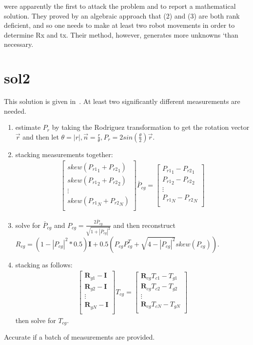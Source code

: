 \documentclass[a4paper]{report}
\begin{document}
\cite{shiu1989calibration} were apparently the
first to attack the problem and to report a mathematical
solution. They proved by an algebraic approach that (2)
and (3) are both rank deficient, and so one needs to
make at least two robot movements in order to
determine Rx and tx. Their method, however,
generates more unknowns ‘than necessary. 

\section{sol2}
This solution is given in~\cite{tsai1989new}. At least two significantly different measurements are needed.
\begin{enumerate}
\item estimate $P_r$ by taking the Rodriguez transformation to get the rotation vector $\vec{r}$ and then let $\theta=|r|, \vec{n}=\frac{r}{\theta}, P_r=2sin(\frac{\theta}{2})\vec{r}$.
\item stacking measurements together:
	\begin{align*}
		\left[
		\begin{matrix}
			skew({P_{r1}}_1+{P_{r2}}_1) \\
			skew({P_{r1}}_2+{P_{r2}}_2) \\
			\vdots \\
			skew({P_{r1}}_N+{P_{r2}}_N) \\
		\end{matrix}
		\right]\bar{P}_{cg} = \left[
		\begin{matrix}
		{P_{r1}}_1-{P_{r2}}_1 \\
		{P_{r1}}_2-{P_{r2}}_2 \\
		\vdots \\
		{P_{r1}}_N-{P_{r2}}_N \\
		\end{matrix}
		\right]
	\end{align*}
\item solve for $\bar{P}_{cg}$ and $P_{cg}=\frac{2\bar{P}_{cg}}{\sqrt{1+|\bar{P}_{cg}|^2}}$ and then reconstruct $R_{cg}=(1-|P_{cg}|^2*0.5)\mathbf{I}+0.5(P_{cg}P_{cg}^T+\sqrt{4-|P_{cg}|^2}skew(P_{cg}))$.
\item stacking as follows:
	\begin{align*}
		\left[
		\begin{matrix}
			\mathbf{R}_{g1}-\mathbf{I} \\
			\mathbf{R}_{g2}-\mathbf{I} \\
			\vdots \\
			\mathbf{R}_{gN}-\mathbf{I} \\
		\end{matrix}
		\right]{T}_{cg} = \left[
		\begin{matrix}
		\mathbf{R}_{cg}T_{c1}-T_{g1} \\ 
		\mathbf{R}_{cg}T_{c2}-T_{g2} \\ 
		\vdots \\
		\mathbf{R}_{cg}T_{cN}-T_{gN} \\ 
		\end{matrix}
		\right]
	\end{align*}
	then solve for $T_{cg}$.
\end{enumerate}
Accurate if a batch of measurements are provided.
\end{document}

